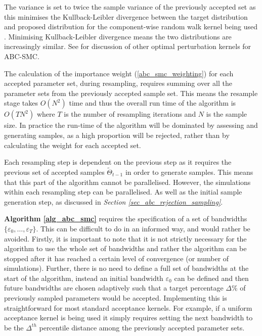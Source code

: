 \documentclass[11pt,a4paper]{article}
\theoremstyle{break}
\begin{document}
  \par The variance is set to twice the sample variance of the previously accepted set as this minimises the Kullback-Leibler divergence between the target distribution and proposed distribution for the component-wise random walk kernel being used \cite[]{adaptive_ABC}.
  Minimising Kullback-Leibler divergence means the two distributions are increasingly similar. See \cite[]{on_optimality_of_kernels_for_approximate_bayesian_computation_using_SMC} for discussion of other optimal perturbation kernels for ABC-SMC.

  \par The calculation of the importance weight (\ref{abc_smc_weighting}) for each accepted parameter set, during resampling, requires summing over all the parameter sets from the previously accepted sample set. This means the resample stage takes $O(N^2)$ time and thus the overall run time of the algorithm is $O(TN^2)$ where $T$ is the number of resampling iterations and $N$ is the sample size. In practice the run-time of the algorithm will be dominated by assessing and generating samples, as a high proportion will be rejected, rather than by calculating the weight for each accepted set.

  \par Each resampling step is dependent on the previous step as it requires the previous set of accepted samples $\tilde\Theta_{t-1}$ in order to generate samples. This means that this part of the algorithm cannot be parallelised. However, the simulations within each resampling step can be parallelised. As well as the initial sample generation step, as discussed in \textit{Section \ref{sec_abc_rejection_sampling}}.

  \par \textbf{Algorithm \ref{alg_abc_smc}} requires the specification of a set of bandwidths $\{\varepsilon_0,\dots,\varepsilon_T\}$. This can be difficult to do in an informed way, and would rather be avoided. Firstly, it is important to note that it is not strictly necessary for the algorithm to use the whole set of bandwidths and rather the algorithm can be stopped after it has reached a certain level of convergence (or number of simulations). Further, there is no need to define a full set of bandwidths at the start of the algorithm, instead an initial bandwidth $\varepsilon_0$ can be defined and then future bandwidths are chosen adaptively such that a target percentage $\Delta\%$ of previously sampled parameters would be accepted. Implementing this is straightforward for most standard acceptance kernels. For example, if a uniform acceptance kernel is being used it simply requires setting the next bandwidth to be the $\Delta^{th}$ percentile distance among the previously accepted parameter sets.
\end{document}
